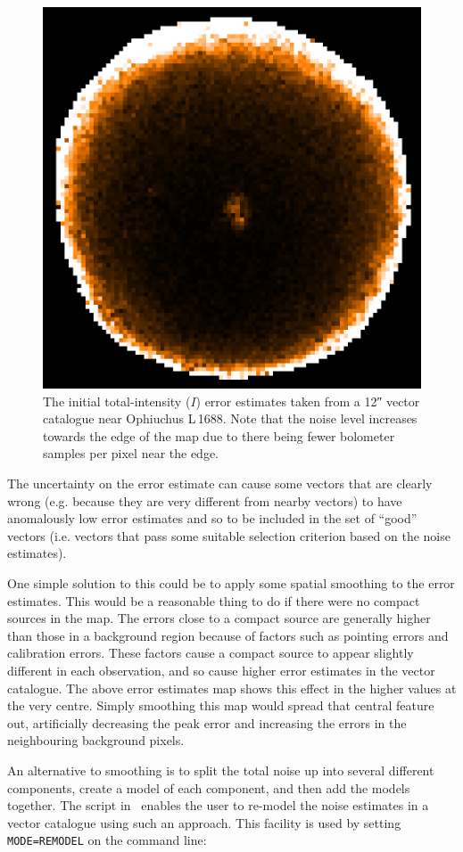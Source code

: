 \begin{figure}[ht!]
\begin{center}
\includegraphics[width=0.46\linewidth]{sc22-ophl1688-noise_on_error-1.png}
\caption [Original Error Estimates in POL-2 Vector Catalogue for Oph L\,1688]{
  The initial total-intensity ($I$) error estimates taken from a 12\si{\arcsecond} vector
  catalogue near Ophiuchus L\,1688. Note that the noise level increases towards the edge
  of the map due to there being fewer bolometer samples per pixel near the edge.
\label{fig:originalerrors}
}
\end{center}
\end{figure}

The uncertainty on the error estimate can cause some vectors that are clearly
wrong (e.g. because they are very different from nearby vectors) to have
anomalously low error estimates and so to be included in the set of ``good''
vectors (i.e. vectors that pass some suitable selection criterion based on the
noise estimates).

One simple solution to this could be to apply some spatial smoothing
to the error estimates. This would be a reasonable thing to do if
there were no compact sources in the map. The errors close to a
compact source are generally higher than those in a background region
because of factors such as pointing errors and calibration errors.
These factors cause a compact source to appear slightly different in
each observation, and so cause higher error estimates in the vector
catalogue. The above error estimates map shows this effect in the
higher values at the very centre. Simply smoothing this map would
spread that central feature out, artificially decreasing the peak
error and increasing the errors in the neighbouring background pixels.

An alternative to smoothing is to split the total noise up into
several different components, create a model of each component, and
then add the models together. The  script in \smurf\
enables the user to re-model the noise estimates in a vector catalogue
using such an approach. This facility is used by setting
\texttt{MODE=REMODEL} on the  command line:

